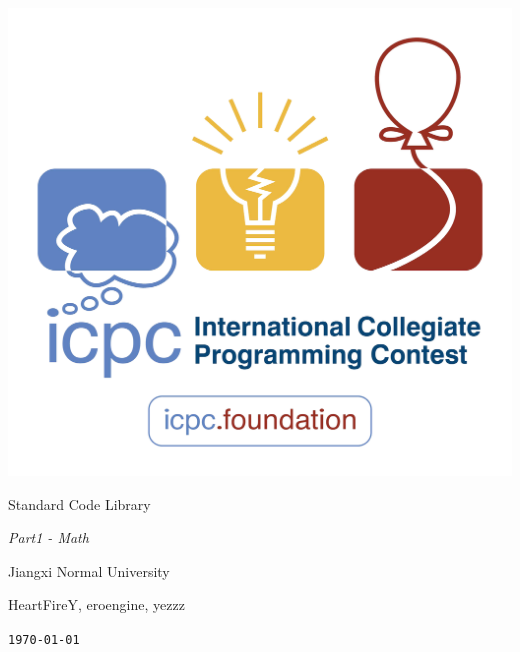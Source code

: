 \documentclass{article}
\begin{document}
\pagestyle{empty}
\begin{center}

    \includegraphics[width=.7\linewidth]{ICPC.png}
    
    \vspace{5em}
    
    \Huge{{Standard Code Library}}
    
    \vspace{2em}
    
    \huge{\textit{Part1 - Math}}
    
    \vspace{2em}
    
    \Large{\textsf{Jiangxi Normal University}}
    
    \vspace{0.4em}
    
    \Large{\textsf{HeartFireY, eroengine, yezzz}}
    
    \vspace{0.6em}
    
    \texttt{\today}
    
\end{center}
\end{document}
